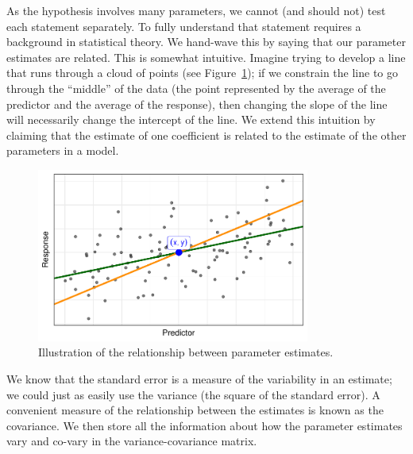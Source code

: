\documentclass[
  letterpaper,
  DIV=11,
  numbers=noendperiod]{scrreprt}
\theoremstyle{definition}
\theoremstyle{definition}
\theoremstyle{remark}
\begin{document}
As the hypothesis involves many parameters, we cannot (and should not)
test each statement separately. To fully understand that statement
requires a background in statistical theory. We hand-wave this by saying
that our parameter estimates are related. This is somewhat intuitive.
Imagine trying to develop a line that runs through a cloud of points
(see Figure~\ref{fig-modeling-linear-hypotheses-line}); if we constrain
the line to go through the ``middle'' of the data (the point represented
by the average of the predictor and the average of the response), then
changing the slope of the line will necessarily change the intercept of
the line. We extend this intuition by claiming that the estimate of one
coefficient is related to the estimate of the other parameters in a
model.

\begin{figure}

{\centering \includegraphics[width=0.8\textwidth,height=\textheight]{./images/fig-modeling-linear-hypotheses-line-1.pdf}

}

\caption{\label{fig-modeling-linear-hypotheses-line}Illustration of the
relationship between parameter estimates.}

\end{figure}

We know that the standard error is a measure of the variability in an
estimate; we could just as easily use the variance (the square of the
standard error). A convenient measure of the relationship between the
estimates is known as the covariance. We then store all the information
about how the parameter estimates vary and co-vary in the
variance-covariance matrix.
\end{document}

